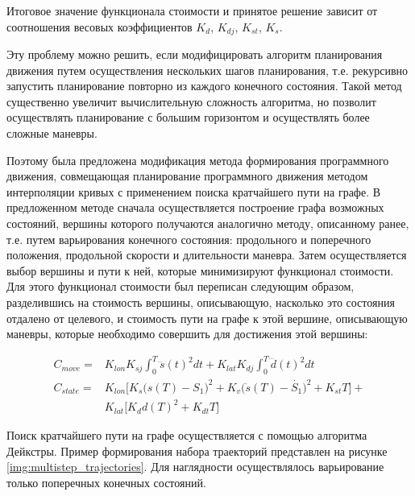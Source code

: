 Итоговое значение функционала стоимости и принятое решение зависит от соотношения весовых коэффициентов $K_d$, $K_{dj}$,
$K_{st}$, $K_s$.

Эту проблему можно решить, если модифицировать алгоритм планирования движения путем осуществления нескольких шагов
планирования, т.е. рекурсивно запустить планирование повторно из каждого конечного состояния. Такой метод существенно
увеличит вычислительную сложность алгоритма, но позволит осуществлять планирование с большим горизонтом и осуществлять
более сложные маневры.

Поэтому была предложена модификация метода формирования программного движения, совмещающая планирование программного
движения методом интерполяции кривых с применением поиска кратчайшего пути на графе. В предложенном методе сначала
осуществляется построение графа возможных состояний, вершины которого получаются аналогично методу, описанному ранее,
т.е. путем варьирования конечного состояния: продольного и поперечного положения, продольной скорости и длительности
маневра. Затем осуществляется выбор вершины и пути к ней, которые минимизируют функционал стоимости. Для этого
функционал стоимости был переписан следующим образом, разделившись на стоимость вершины, описывающую, насколько это
состояния отдалено от целевого, и  стоимость пути на графе к этой вершине, описывающую маневры, которые необходимо
совершить для достижения этой вершины:

\begin{align}
    C_{move}  = &K_{lon}K_{sj}\int_{0}^{T}{\dddot{s}(t)^2dt} + K_{lat}K_{dj}\int_{0}^{T}{\dddot{d}(t)^2dt} \\
    C_{state} = &K_{lon}\Big[K_s \big(s(T) - S_1\big)^2 + K_v \big(\dot{s}(T) - \dot{S_1}\big)^2 + K_{st} T\Big] + \\
                &K_{lat}\Big[K_d d(T)^2 + K_{dt} T\Big] \nonumber
\end{align}

Поиск кратчайшего пути на графе осуществляется с помощью алгоритма Дейкстры. Пример формирования набора траекторий
представлен на рисунке \ref{img:multistep_trajectories}. Для наглядности осуществлялось варьирование только поперечных
конечных состояний.

